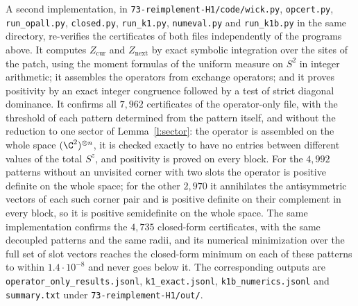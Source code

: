 A second implementation, in \texttt{73-reimplement-H1/\allowbreak code/\allowbreak wick.py}, \texttt{opcert.py}, \texttt{run\_\allowbreak opall.py}, \texttt{closed.py}, \texttt{run\_\allowbreak k1.py}, \texttt{numeval.py} and \texttt{run\_\allowbreak k1b.py} in the same directory, re-verifies the certificates of both files independently of the programs above. It computes $Z_{\mathrm{cur}}$ and $Z_{\mathrm{next}}$ by exact symbolic integration over the sites of the patch, using the moment formulas of the uniform measure on $S^2$ in integer arithmetic; it assembles the operators from exchange operators; and it proves positivity by an exact integer congruence followed by a test of strict diagonal dominance. It confirms all $7{, }962$ certificates of the operator-only file, with the threshold of each pattern determined from the pattern itself, and without the reduction to one sector of Lemma~\ref{l:sector}: the operator is assembled on the whole space $(\C^2)^{\otimes n}$, it is checked exactly to have no entries between different values of the total $S^z$, and positivity is proved on every block. For the $4{, }992$ patterns without an unvisited corner with two slots the operator is positive definite on the whole space; for the other $2{, }970$ it annihilates the antisymmetric vectors of each such corner pair and is positive definite on their complement in every block, so it is positive semidefinite on the whole space. The same implementation confirms the $4{, }735$ closed-form certificates, with the same decoupled patterns and the same radii, and its numerical minimization over the full set of slot vectors reaches the closed-form minimum on each of these patterns to within $1.4 \cdot 10^{-8}$ and never goes below it. The corresponding outputs are \texttt{operator\_\allowbreak only\_\allowbreak results.jsonl}, \texttt{k1\_\allowbreak exact.jsonl}, \texttt{k1b\_\allowbreak numerics.jsonl} and \texttt{summary.txt} under \texttt{73-reimplement-H1/\allowbreak out/\allowbreak }.

